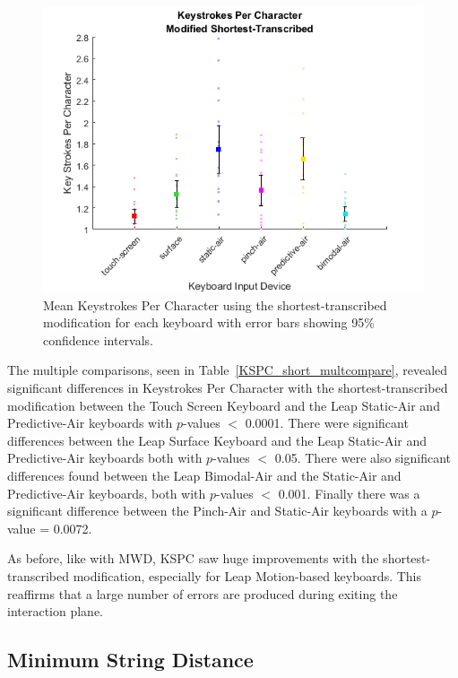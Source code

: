 \begin{figure}[h]
	\centering
	\includegraphics{fig_KSPC_short_mean}
	\caption[Mean Keystrokes Per Character for Modified-Shortest]{Mean Keystrokes Per Character using the shortest-transcribed modification for each keyboard with error bars showing 95\% confidence intervals.}
	\label{fig_KSPC_short_mean}
\end{figure}

The multiple comparisons, seen in Table~\ref{KSPC_short_multcompare}, revealed significant differences in Keystrokes Per Character with the shortest-transcribed modification between the Touch Screen Keyboard and the Leap Static-Air and Predictive-Air keyboards with $p$-values $<$ 0.0001. There were significant differences between the Leap Surface Keyboard and the Leap Static-Air and Predictive-Air keyboards both with $p$-values $<$ 0.05. There were also significant differences found between the Leap Bimodal-Air and the Static-Air and Predictive-Air keyboards, both with $p$-values $<$ 0.001. Finally there was a significant difference between the Pinch-Air and Static-Air keyboards with a $p$-value = 0.0072.

As before, like with MWD, KSPC saw huge improvements with the shortest-transcribed modification, especially for Leap Motion-based keyboards. This reaffirms that a large number of errors are produced during exiting the interaction plane.

\subsection{Minimum String Distance}

